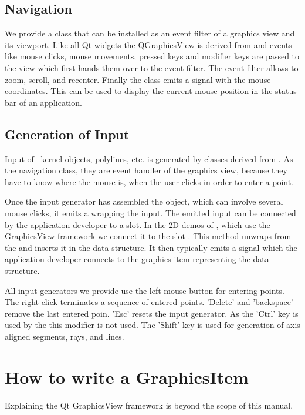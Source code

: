 \subsection{Navigation}

We provide a class  that can be installed as an
event filter of a graphics view and its viewport. Like all Qt widgets
the {QGraphicsView} is derived from
 and events like mouse clicks, mouse movements, pressed keys and 
modifier keys are passed to the view which first hands them over to the
event filter.  The  event filter allows to zoom, scroll, and recenter.
Finally the class emits a signal with the mouse coordinates. This can be used
to display the current mouse position in the status bar of an application.

\subsection{Generation of Input}

Input of \cgal\ kernel objects, polylines, etc. is generated by classes derived
from .  As the navigation class, they are event handler of the
graphics view, because they have to know where the mouse is, when the user clicks
in order to enter a point.

Once the input generator has assembled the object, which can involve several mouse clicks,
it emits a  wrapping the input.  The emitted input can be connected
by the application developer to a slot. In the 2D demos of \cgal, which use the 
GraphicsView framework we connect it to the slot .
This method unwraps from the  and inserts it in the data structure. 
It then typically emits a signal  which the application developer 
connects to the graphics item representing the data structure.

All input generators we provide use the left mouse button for entering points.
The right click terminates a sequence of entered points. 'Delete' and 'backspace'
remove the last entered poin. 'Esc' resets the input generator.  As the 'Ctrl' key
is used by the  this modifier is not used.  The 'Shift'
key is used for generation of axis aligned segments, rays, and lines. 

\section{How to write a GraphicsItem} 

Explaining the Qt GraphicsView framework is beyond the scope of this manual.

